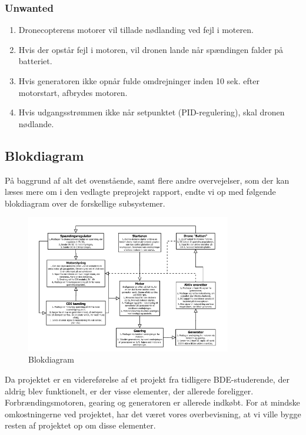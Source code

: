 \subsubsection{Unwanted}
\label{sec:kravspecifikation-4}

\begin{enumerate}[label=2.1.4.\arabic*]
\item Dronecopterens motorer vil tillade nødlanding ved fejl i moteren.
\item Hvis der opstår fejl i motoren, vil dronen lande når spændingen falder på batteriet.
\item Hvis generatoren ikke opnår fulde omdrejninger inden 10 sek. efter motorstart, afbrydes motoren.
\item Hvis udgangsstrømmen ikke når setpunktet (PID-regulering), skal dronen nødlande.
\end{enumerate}

\subsection{Blokdiagram}
\label{sec:blokdiagram-}

På baggrund af alt det ovenstående, samt flere andre overvejelser, som der kan læses mere om i den vedlagte preprojekt rapport, endte vi op med følgende blokdiagram over de forskellige subsystemer.

\begin{figure}[h]
  \centering
  \includegraphics[width=0.8\textwidth]{./figurer/int2.png}
  \caption{Blokdiagram}
  \label{fig:int2}
\end{figure}

Da projektet er en videreførelse af et projekt fra tidligere BDE-studerende, der aldrig blev funktionelt, er der visse elementer, der allerede foreligger. Forbrændingsmotoren, gearing og generatoren er allerede indkøbt. For at mindske omkostningerne ved projektet, har det været vores overbevisning, at vi ville bygge resten af projektet op om disse elementer. 

